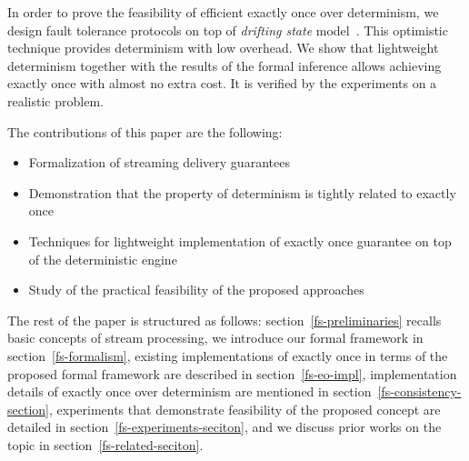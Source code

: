 In order to prove the feasibility of efficient exactly once over determinism, we design fault tolerance protocols on top of {\em drifting state} model~\cite{we2018adbis}. This optimistic technique provides determinism with low overhead. We show that lightweight determinism together with the results of the formal inference allows achieving exactly once with almost no extra cost. It is verified by the experiments on a realistic problem.

The contributions of this paper are the following: 
\begin{itemize}
    \item Formalization of streaming delivery guarantees 
    \item Demonstration that the property of determinism is tightly related to exactly once
    \item Techniques for lightweight implementation of exactly once guarantee on top of the deterministic engine
    \item Study of the practical feasibility of the proposed approaches
\end{itemize}

The rest of the paper is structured as follows: section~\ref{fs-preliminaries} recalls basic concepts of stream processing, we introduce our formal framework in section~\ref{fs-formalism}, existing implementations of exactly once in terms of the proposed formal framework are described in section~\ref{fs-eo-impl}, implementation details of exactly once over determinism are mentioned in section~\ref{fs-consistency-section}, experiments that demonstrate feasibility of the proposed concept are detailed in section~\ref{fs-experiments-seciton}, and we discuss prior works on the topic in section~\ref{fs-related-seciton}. 
